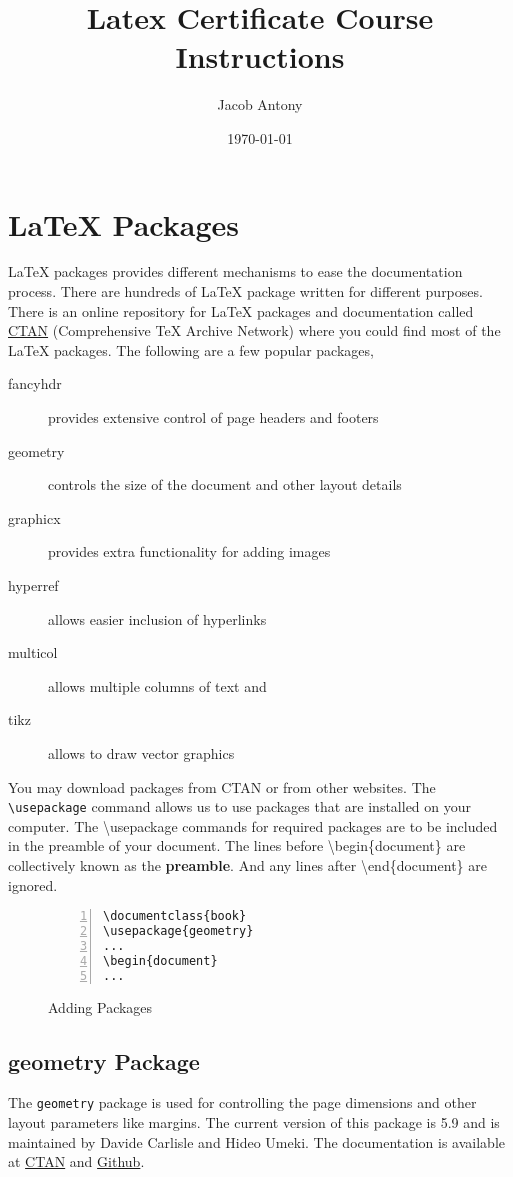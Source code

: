 \documentclass{article}
\title{Latex Certificate Course Instructions}
\author{Jacob Antony}
\date{\today}
\begin{document}
\maketitle

\section{\LaTeX{} Packages}
\LaTeX{} packages provides different mechanisms to ease the documentation process. There are hundreds of \LaTeX{} package written for different purposes. There is an online repository for \LaTeX{} packages and documentation called \href{https://ctan.org/pkg}{CTAN} (Comprehensive TeX Archive Network) where you could find most of the \LaTeX{} packages. The following are a few popular packages,
\begin{description}
	\item[fancyhdr] provides extensive control of page headers and footers
	\item[geometry] controls the size of the document and other layout details
	\item[graphicx] provides extra functionality for adding images
	\item[hyperref] allows easier inclusion of hyperlinks
	\item[multicol] allows multiple columns of text and
	\item[tikz] allows to draw vector graphics
\end{description}

You may download packages from CTAN or from other websites. The \texttt{\textbackslash usepackage} command allows us to use packages that are installed on your computer. The \textbackslash usepackage commands for required packages are to be included in the preamble of your document. The lines before \textbackslash begin\{document\} are collectively known as the \textbf{preamble}. And any lines after \textbackslash end\{document\} are ignored.

\begin{figure}[h]
\centering
\begin{Verbatim}[numbers = left]
\documentclass{book}
\usepackage{geometry}
...
\begin{document}
...
\end{Verbatim}
\caption{Adding Packages}
\end{figure}

\subsection{geometry Package}
	The \texttt{geometry} package is used for controlling the page dimensions and other layout parameters like margins. The current version of this package is 5.9 and is maintained by Davide Carlisle and Hideo Umeki. The documentation is available at \href{https://ctan.org/pkg/geometry}{CTAN} and \href{https://github.com/davidcarlisle/geometry}{Github}.
\end{document}
